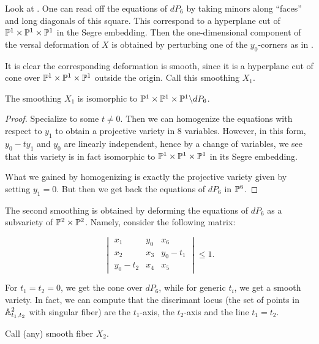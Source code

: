 \documentclass[]{uiophd}
\begin{document}
Look at . One can read off the equations of $dP_6$ by taking minors along ``faces'' and long diagonals of this square. This correspond to a hyperplane cut of $\mathbb{P}^ 1 \times \mathbb{P}^1 \times \mathbb{P}^1$ in the Segre embedding. Then the one-dimensional component of the versal deformation of $X$ is obtained by perturbing one of the $y_0$-corners as in .

It is clear the corresponding deformation is smooth, since it is a hyperplane cut of cone over $\mathbb{P}^1 \times \mathbb{P}^1 \times \mathbb{P}^1$ outside the origin. Call this smoothing $X_1$.

\begin{lemma}
The smoothing $X_1$ is isomorphic to $\mathbb{P}^1 \times \mathbb{P}^1 \times \mathbb{P}^1 \backslash dP_6$.
\end{lemma}
\begin{proof}
Specialize to some $t \neq 0$. Then we can homogenize the equations with respect to $y_1$ to obtain a projective variety in $8$ variables. However, in this form, $y_0-ty_1$ and $y_0$ are linearly independent, hence by a change of variables, we see that this variety is in fact isomorphic to $\mathbb{P}^1 \times \mathbb{P}^1 \times \mathbb{P}^1$ in its Segre embedding.

What we gained by homogenizing is exactly the projective variety given by setting $y_1=0$. But then we get back the equations of $dP_6$ in $\mathbb{P}^6$.
\end{proof}

The second smoothing is obtained by deforming the equations of $dP_6$ as a subvariety of $\mathbb{P}^2 \times \mathbb{P}^2$. Namely, consider the following matrix:

\begin{equation}
\label{eq:def2}
\begin{vmatrix}
x_1 & y_0 & x_6 \\
x_2 & x_3 & y_0-t_1 \\
y_0-t_2 & x_4 & x_5
\end{vmatrix} \leq 1.
\end{equation}


For $t_1=t_2=0$, we get the cone over $dP_6$, while for generic $t_i$, we get a smooth variety. In fact, we can compute that the discrimant locus (the set of points in $\mathbb{A}^2_{t_1,t_2}$ with singular fiber) are the $t_1$-axis, the $t_2$-axis and the line $t_1=t_2$. 

Call (any) smooth fiber $X_2$. 
\end{document}
